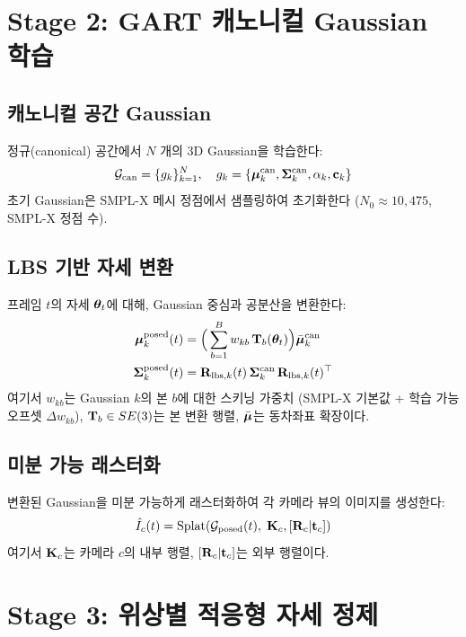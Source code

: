 \documentclass[11pt, a4paper]{report}
\begin{document}
\section{Stage 2: GART 캐노니컬 Gaussian 학습}

\subsection{캐노니컬 공간 Gaussian}

정규(canonical) 공간에서 $N$ 개의 3D Gaussian을 학습한다:
\begin{equation}
  \mathcal{G}_{\text{can}} = \{g_k\}_{k=1}^{N}, \quad
  g_k = \{\bm{\mu}_k^{\text{can}}, \bm{\Sigma}_k^{\text{can}}, \alpha_k, \mathbf{c}_k\}
\end{equation}
초기 Gaussian은 SMPL-X 메시 정점에서 샘플링하여 초기화한다 ($N_0 \approx 10,475$, SMPL-X 정점 수).

\subsection{LBS 기반 자세 변환}

프레임 $t$의 자세 $\bm{\theta}_t$에 대해, Gaussian 중심과 공분산을 변환한다:
\begin{align}
  \bm{\mu}_k^{\text{posed}}(t) &= \Big(\sum_{b=1}^{B} w_{kb}\, \mathbf{T}_b(\bm{\theta}_t)\Big) \bar{\bm{\mu}}_k^{\text{can}} \\
  \bm{\Sigma}_k^{\text{posed}}(t) &= \mathbf{R}_{\text{lbs},k}(t)\, \bm{\Sigma}_k^{\text{can}}\, \mathbf{R}_{\text{lbs},k}(t)^\top
\end{align}
여기서 $w_{kb}$는 Gaussian $k$의 본 $b$에 대한 스키닝 가중치 (SMPL-X 기본값 + 학습 가능 오프셋 $\Delta w_{kb}$),
$\mathbf{T}_b \in SE(3)$는 본 변환 행렬, $\bar{\bm{\mu}}$는 동차좌표 확장이다.

\subsection{미분 가능 래스터화}

변환된 Gaussian을 미분 가능하게 래스터화하여 각 카메라 뷰의 이미지를 생성한다:
\begin{equation}
  \hat{I}_c(t) = \text{Splat}(\mathcal{G}_{\text{posed}}(t),\; \mathbf{K}_c, [\mathbf{R}_c | \mathbf{t}_c])
\end{equation}
여기서 $\mathbf{K}_c$는 카메라 $c$의 내부 행렬, $[\mathbf{R}_c|\mathbf{t}_c]$는 외부 행렬이다.


\section{Stage 3: 위상별 적응형 자세 정제}
\label{sec:phase_adaptive}
\end{document}
